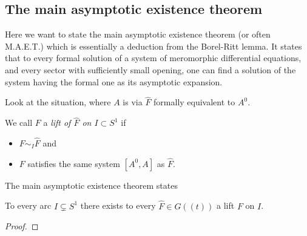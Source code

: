 \subsection{The main asymptotic existence theorem}
\TODO[move] 
\begin{comment}
  \begin{multicols}{2}
    \textbf{Classical:}
    \begin{itemize}
      \item \cite[Thm.4.4.1]{Loday2014}
      \item \cite[Thm.7.10]{van2003galois}{\tiny\cite[Thm.7.12]{van2003galois}}
      \item \cite[Thm.12.1]{wasow2002asymptotic}
      \item \cite[5.3.Thm.1]{Varadarajan96linearmeromorphic}
      \item \cite[207]{Balser2000Formal}: Some historical remarks
    \end{itemize}
  \columnbreak
    \textbf{Sheafical:}
    \begin{itemize}
      \item \cite[Thm.2.3.1]{sabbah_cimpa90}
    \end{itemize}
  \end{multicols}
\end{comment}
Here we want to state the main asymptotic existence theorem (or often M.A.E.T.)
which is essentially a deduction from the Borel-Ritt lemma.
It states that to every formal solution of a system of meromorphic differential
equations, and every sector with sufficiently small opening, one can find a
solution of the system having the formal one as its asymptotic expansion.

Look at the situation, where $A$ is via $\hat F$ formally equivalent to $A^0$.

\begin{defn}
  We call $F$ a \emph{lift of $\hat F$ on $I\subset S^1$} if
  \begin{itemize}
    \item $F\sim_I\hat F$ and
    \item $F$ satisfies the same system $[A^0,A]$ as $\hat F$.
  \end{itemize}
\end{defn}
The main asymptotic existence theorem states
\begin{thm}[M.E.A.T]\label{thm:meat}
  To every arc $I\subsetneq S^1$ there exists to every $\hat F\in G(\!(t)\!)$ a
  lift $F$ on $I$.
\end{thm}
\begin{proof}
  \TODO{}
\end{proof}

